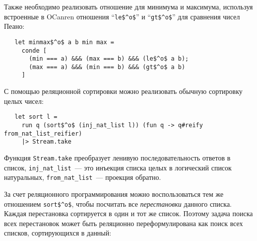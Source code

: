 Также необходимо реализовать отношение для минимума и максимума, используя встроенные в OCanren отношения \enquote{\lstinline|le$^o$|} и \enquote{\lstinline|gt$^o$|} для сравнения чисел Пеано:

\begin{lstlisting}
   let minmax$^o$ a b min max =
     conde [
       (min === a) &&& (max === b) &&& (le$^o$ a b);
       (max === a) &&& (min === b) &&& (gt$^o$ a b)
     ]
\end{lstlisting}


С помощью реляционной сортировки можно реализовать обычную сортировку целых чисел:

\begin{lstlisting}
   let sort l =
     run q (sort$^o$ (inj_nat_list l)) (fun q -> q#reify from_nat_list_reifier)
     |> Stream.take
\end{lstlisting}

Функция \lstinline|Stream.take| преобразует ленивую последовательность ответов в список,
\lstinline|inj_nat_list|~--- это инъекция списка целых в логический список натуральных,
\lstinline|from_nat_list|~--- проекция обратно.


За счет реляционного программирования можно воспользоваться тем же отношением \lstinline|sort$^o$|, чтобы посчитать все \emph{перестановки}  данного списка.
Каждая перестановка сортируется в один и тот же список.
Поэтому задача поиска всех перестановок может быть реляционно переформулирована как поиск всех списков, сортирующихся в данный:



